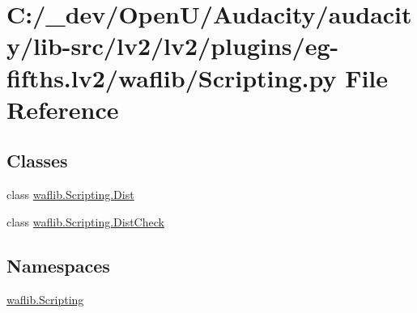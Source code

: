 \hypertarget{lv2_2plugins_2eg-fifths_8lv2_2waflib_2_scripting_8py}{}\section{C\+:/\+\_\+dev/\+Open\+U/\+Audacity/audacity/lib-\/src/lv2/lv2/plugins/eg-\/fifths.lv2/waflib/\+Scripting.py File Reference}
\label{lv2_2plugins_2eg-fifths_8lv2_2waflib_2_scripting_8py}
\subsection*{Classes}
\begin{DoxyCompactItemize}
\item 
class \hyperlink{classwaflib_1_1_scripting_1_1_dist}{waflib.\+Scripting.\+Dist}
\item 
class \hyperlink{classwaflib_1_1_scripting_1_1_dist_check}{waflib.\+Scripting.\+Dist\+Check}
\end{DoxyCompactItemize}
\subsection*{Namespaces}
\begin{DoxyCompactItemize}
\item 
 \hyperlink{namespacewaflib_1_1_scripting}{waflib.\+Scripting}
\end{DoxyCompactItemize}

